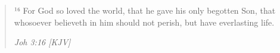 \begin{quote}
¹⁶ For God so loved the world, that he gave his only begotten Son, that whosoever believeth in him should not perish, but have everlasting life.
\begin{flushright}
\emph{Joh 3:16 [KJV]}
\end{flushright}
\end{quote}